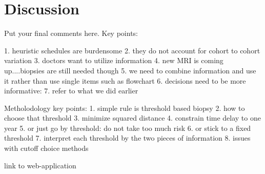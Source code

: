 \section{Discussion}
\label{sec:discussion}

Put your final comments here. 
Key points:

1. heuristic schedules are burdensome
2. they do not account for cohort to cohort variation
3. doctors want to utilize information
4. new MRI is coming up....biopsies are still needed though
5. we need to combine information and use it rather than use single items such as flowchart
6. decisions need to be more informative: 
7. refer to what we did earlier

Metholodology key points:
1. simple rule is threshold based biopsy
2. how to choose that threshold
3. minimize squared distance
4. constrain time delay to one year
5. or just go by threshold: do not take too much risk
6. or stick to a fixed threshold
7. interpret each threshold by the two pieces of information
8. issues with cutoff choice methods

link to web-application